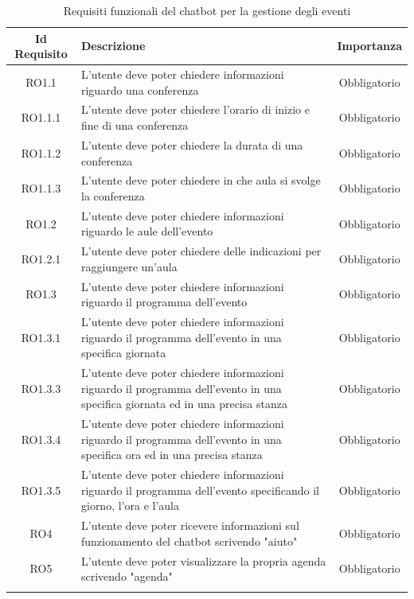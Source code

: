 \normalsize
\begin{longtable}{|c|>{\centering}m{7cm}|c|}
\hline
\textbf{Id Requisito} & \textbf{Descrizione} & \textbf{Importanza}\\
\hline
\endhead
RO1.1 & L'utente deve poter chiedere informazioni riguardo una conferenza & Obbligatorio\\ 
RO1.1.1 & L'utente deve poter chiedere l'orario di inizio e fine di una conferenza & Obbligatorio\\ 
RO1.1.2 & L'utente deve poter chiedere la durata di una conferenza & Obbligatorio\\
RO1.1.3 & L'utente deve poter chiedere in che aula si svolge la conferenza & Obbligatorio\\  
RO1.2 & L'utente deve poter chiedere informazioni riguardo le aule dell'evento & Obbligatorio\\ 
RO1.2.1 & L'utente deve poter chiedere delle indicazioni per raggiungere un'aula & Obbligatorio\\ 
RO1.3 & L'utente deve poter chiedere informazioni riguardo il programma dell'evento & Obbligatorio\\ 
RO1.3.1 & L'utente deve poter chiedere informazioni riguardo il programma dell'evento in una specifica giornata & Obbligatorio\\ 
RO1.3.3 & L'utente deve poter chiedere informazioni riguardo il programma dell'evento in una specifica giornata ed in una precisa stanza & Obbligatorio\\
RO1.3.4 & L'utente deve poter chiedere informazioni riguardo il programma dell'evento in una specifica ora ed in una precisa stanza & Obbligatorio\\
RO1.3.5 & L'utente deve poter chiedere informazioni riguardo il programma dell'evento specificando il giorno, l'ora e l'aula & Obbligatorio\\
RO4 & L'utente deve poter ricevere informazioni sul funzionamento del chatbot scrivendo "aiuto" & Obbligatorio\\ 
RO5 & L'utente deve poter visualizzare la propria agenda scrivendo "agenda" & Obbligatorio\\ 
\hline
\caption{Requisiti funzionali del chatbot per la gestione degli eventi}
\end{longtable}

